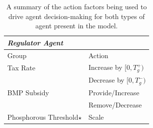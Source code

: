 \begin{table}
    \caption{A summary of the action factors being used to drive agent
    decision-making for both types of agent present in the model.}
    \label{tab:farm_action_reg}
    \begin{tabularx}{\linewidth}{lX}
        \emph{Regulator Agent} \\
        \hline
        \hline
        Group & Action  \\
        \hline
        Tax Rate & Increase by $[0, T^+_g)$ \\
        & Decrease by $[0, T^-_g)$ \\
        BMP Subsidy & Provide/Increase \\
        & Remove/Decrease  \\
        Phosphorous Threshold$\star$ & Scale  \\
        \hline
    \end{tabularx}
\end{table}

